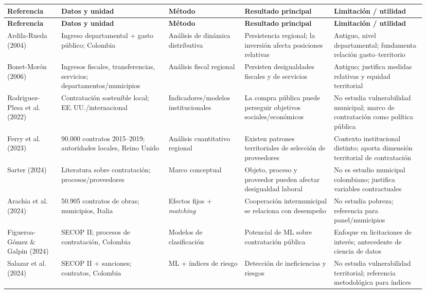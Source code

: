 \documentclass[11pt,letterpaper]{article}
\begin{document}
\begin{center}
\footnotesize
\begin{longtable}{p{2.1cm}p{3.0cm}p{3.0cm}p{3.6cm}p{3.6cm}}
\toprule
\textbf{Referencia} & \textbf{Datos y unidad} & \textbf{Método} & \textbf{Resultado principal} & \textbf{Limitación / utilidad} \\
\midrule
\endfirsthead
\toprule
\textbf{Referencia} & \textbf{Datos y unidad} & \textbf{Método} & \textbf{Resultado principal} & \textbf{Limitación / utilidad} \\
\midrule
\endhead
Ardila-Rueda (2004) & Ingreso departamental + gasto público; Colombia & Análisis de dinámica distributiva & Persistencia regional; la inversión afecta posiciones relativas & Antiguo, nivel departamental; fundamenta relación gasto--territorio \\
Bonet-Morón (2006) & Ingresos fiscales, transferencias, servicios; departamentos/municipios & Análisis fiscal regional & Persisten desigualdades fiscales y de servicios & Antiguo; justifica medidas relativas y equidad territorial \\
Rodriguez-Plesa et al. (2022) & Contratación sostenible local; EE.\,UU./internacional & Indicadores/modelos institucionales & La compra pública puede perseguir objetivos sociales/económicos & No estudia vulnerabilidad municipal; marco de contratación como política pública \\
Ferry et al. (2023) & 90.000 contratos 2015--2019; autoridades locales, Reino Unido & Análisis cuantitativo regional & Existen patrones territoriales de selección de proveedores & Contexto institucional distinto; aporta dimensión territorial de contratación \\
Sarter (2024) & Literatura sobre contratación; procesos/proveedores & Marco conceptual & Objeto, proceso y proveedor pueden afectar desigualdad laboral & No es estudio municipal colombiano; justifica variables contractuales \\
Arachia et al. (2024) & 50.905 contratos de obras; municipios, Italia & Efectos fijos + \textit{matching} & Cooperación intermunicipal se relaciona con desempeño & No estudia pobreza; referencia para panel/municipios \\
Figueroa-Gómez \& Galpin (2024) & SECOP II; procesos de contratación, Colombia & Modelos de clasificación & Potencial de ML sobre contratación pública & Enfoque en licitaciones de interés; antecedente de ciencia de datos \\
Salazar et al. (2024) & SECOP II + sanciones; contratos, Colombia & ML + índices de riesgo & Detección de ineficiencias y riesgos & No estudia vulnerabilidad territorial; referencia metodológica para índices \\

\end{longtable}
\end{center}
\end{document}
